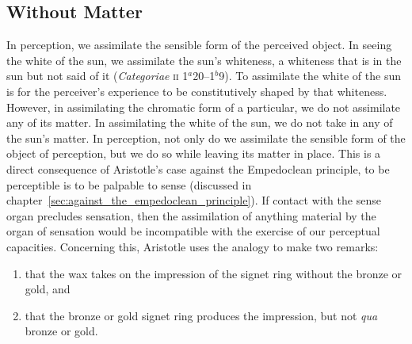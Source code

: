 
\subsection{Without Matter} %
\label{sub:without_matter}

In perception, we assimilate the sensible form of the perceived object. In seeing the white of the sun, we assimilate the sun's whiteness, a whiteness that is in the sun but not said of it (\emph{Categoriae} \textsc{ii} 1\( ^{a} \)20--1\( ^{b} \)9). To assimilate the white of the sun is for the perceiver's experience to be constitutively shaped by that whiteness. However, in assimilating the chromatic form of a particular, we do not assimilate any of its matter. In assimilating the white of the sun, we do not take in any of the sun's matter. In perception, not only do we assimilate the sensible form of the object of perception, but we do so while leaving its matter in place. This is a direct consequence of Aristotle's case against the Empedoclean principle, to be perceptible is to be palpable to sense (discussed in chapter~\ref{sec:against_the_empedoclean_principle}). If contact with the sense organ precludes sensation, then the assimilation of anything material by the organ of sensation would be incompatible with the exercise of our perceptual capacities. Concerning this, Aristotle uses the analogy to make two remarks:
\begin{enumerate}[(1)]
	\item that the wax takes on the impression of the signet ring without the bronze or gold, and
	\item that the bronze or gold signet ring produces the impression, but not \emph{qua} bronze or gold.
\end{enumerate}

